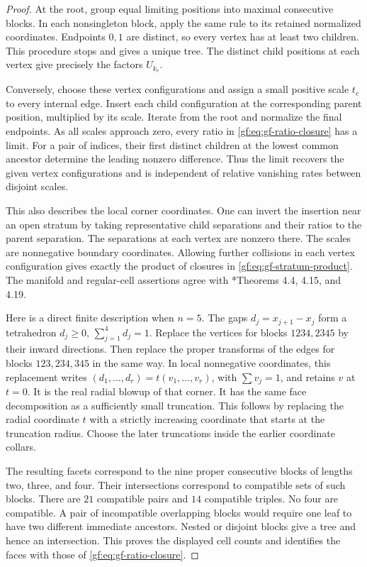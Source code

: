 \begin{proof}
At the root, group equal limiting positions into maximal consecutive
blocks.  In each nonsingleton block, apply the same rule to its
retained normalized coordinates.  Endpoints \(0,1\) are distinct,
so every vertex has at least two children.  This procedure stops
and gives a unique tree.  The distinct child positions at each
vertex give precisely the factors \(U_{k_v}\).

Conversely, choose these vertex configurations and assign a small
positive scale \(t_e\) to every internal edge.  Insert each child
configuration at the corresponding parent position, multiplied by
its scale.  Iterate from the root and normalize the final endpoints.
As all scales approach zero, every ratio in
\eqref{gf:eq:gf-ratio-closure} has a limit.  For a pair of indices,
their first distinct children at the lowest common ancestor determine
the leading nonzero difference.  Thus the limit recovers the given
vertex configurations and is independent of relative vanishing rates
between disjoint scales.

This also describes the local corner coordinates.  One can invert
the insertion near an open stratum by taking representative child
separations and their ratios to the parent separation.  The separations
at each vertex are nonzero there.  The scales are nonnegative boundary
coordinates.  Allowing further collisions in each vertex configuration
gives exactly the product of closures in
\eqref{gf:eq:gf-stratum-product}.
The manifold and regular-cell assertions agree with
\cite{GF-Sinha}*{Theorems 4.4, 4.15, and 4.19}.

Here is a direct finite description when \(n=5\).
The gaps \(d_j=x_{j+1}-x_j\) form a tetrahedron
\(d_j\geq0\), \(\sum_{j=1}^4d_j=1\).
Replace the vertices for blocks \(1234,2345\) by their inward
directions.  Then replace the proper transforms of the edges for
blocks \(123,234,345\) in the same way.
In local nonnegative coordinates, this replacement writes
\((d_1,\ldots,d_r)=t(v_1,\ldots,v_r)\), with
\(\sum v_j=1\), and retains \(v\) at \(t=0\).
It is the real radial blowup of that corner.
It has the same face decomposition as a sufficiently small truncation.
This follows by replacing the radial coordinate \(t\) with a
strictly increasing coordinate that starts at the truncation radius.
Choose the later truncations inside the earlier coordinate collars.

The resulting facets correspond to the nine proper consecutive
blocks of lengths two, three, and four.  Their intersections
correspond to compatible sets of such blocks.  There are \(21\)
compatible pairs and \(14\) compatible triples.  No four are
compatible.  A pair of incompatible overlapping blocks would require
one leaf to have two different immediate ancestors.
Nested or disjoint blocks give a tree and hence an intersection.
This proves the displayed cell counts and identifies the faces
with those of \eqref{gf:eq:gf-ratio-closure}.
\end{proof}

